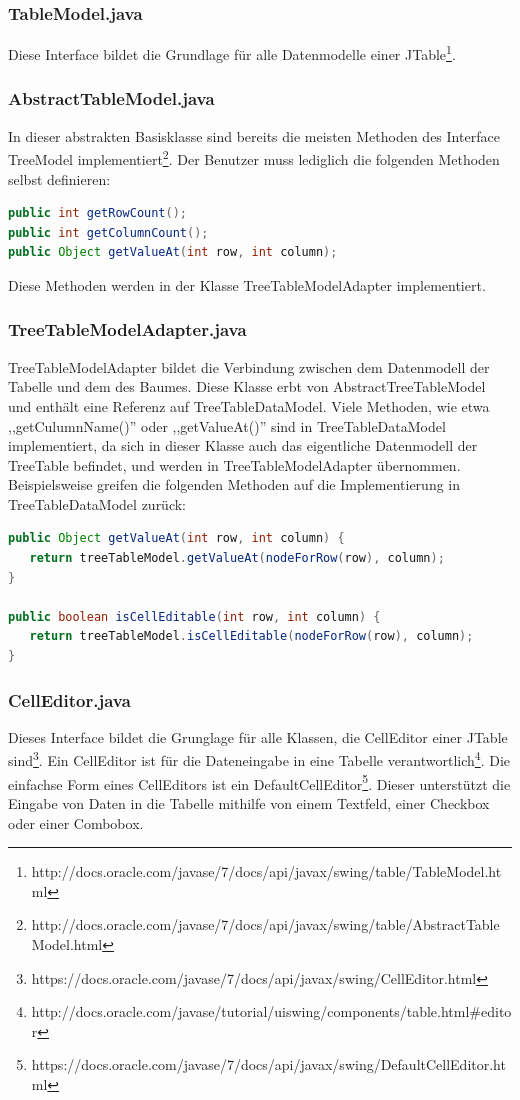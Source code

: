 \subsubsection*{TableModel.java}
Diese Interface bildet die Grundlage für alle Datenmodelle einer JTable\footnote{http://docs.oracle.com/javase/7/docs/api/javax/swing/table/TableModel.html}.

\subsubsection*{AbstractTableModel.java}
In dieser abstrakten Basisklasse sind bereits die meisten Methoden des Interface TreeModel implementiert\footnote{http://docs.oracle.com/javase/7/docs/api/javax/swing/table/AbstractTableModel.html}. Der Benutzer muss lediglich die folgenden Methoden selbst definieren:
\begin{lstlisting}[language=JAVA]
public int getRowCount();
public int getColumnCount();
public Object getValueAt(int row, int column);
\end{lstlisting}
Diese Methoden werden in der Klasse TreeTableModelAdapter implementiert.

\subsubsection*{TreeTableModelAdapter.java}
TreeTableModelAdapter bildet die Verbindung zwischen dem Datenmodell der Tabelle und dem des Baumes. Diese Klasse erbt von AbstractTreeTableModel und enthält eine Referenz auf TreeTableDataModel. Viele Methoden, wie etwa ,,getCulumnName()'' oder ,,getValueAt()'' sind in TreeTableDataModel implementiert, da sich in dieser Klasse auch das eigentliche Datenmodell der TreeTable befindet, und werden in TreeTableModelAdapter übernommen. Beispielsweise greifen die folgenden Methoden auf die Implementierung in TreeTableDataModel zurück:
\begin{lstlisting}[language=JAVA]
public Object getValueAt(int row, int column) {
   return treeTableModel.getValueAt(nodeForRow(row), column);
}

public boolean isCellEditable(int row, int column) {
   return treeTableModel.isCellEditable(nodeForRow(row), column);
}
\end{lstlisting}

\subsubsection*{CellEditor.java}
Dieses Interface bildet die Grunglage für alle Klassen, die CellEditor einer JTable sind\footnote{https://docs.oracle.com/javase/7/docs/api/javax/swing/CellEditor.html}.
\newline
Ein CellEditor ist für die Dateneingabe in eine Tabelle verantwortlich\footnote{http://docs.oracle.com/javase/tutorial/uiswing/components/table.html\#editor}. Die einfachse Form eines CellEditors ist ein DefaultCellEditor\footnote{https://docs.oracle.com/javase/7/docs/api/javax/swing/DefaultCellEditor.html}. Dieser unterstützt die Eingabe von Daten in die Tabelle mithilfe von einem Textfeld, einer Checkbox oder einer Combobox.

